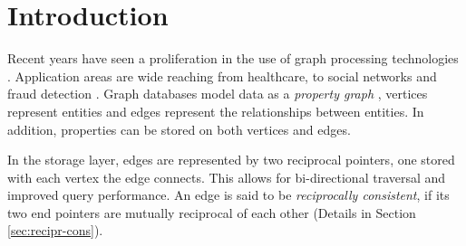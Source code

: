 \documentclass[sigplan,10pt]{acmart}
\begin{document}





\maketitle

\section{Introduction}
\label{sec:introduction}

Recent years have seen a proliferation in the use of graph processing technologies \cite{Besta2019}. Application areas are wide reaching from healthcare, to social networks and fraud detection \cite{Eifrem2016}. Graph databases model data as a \textit{property graph} \cite{Robinson2015}, vertices represent entities and edges represent the relationships between entities. In addition, properties can be stored on both vertices and edges.

In the storage layer, edges are represented by two reciprocal pointers, one stored with each vertex the edge connects. This allows for bi-directional traversal and improved query performance. An edge is said to be \emph{reciprocally consistent}, if its two end pointers are mutually reciprocal of each other (Details in Section \ref{sec:recipr-cons}).
\end{document}
